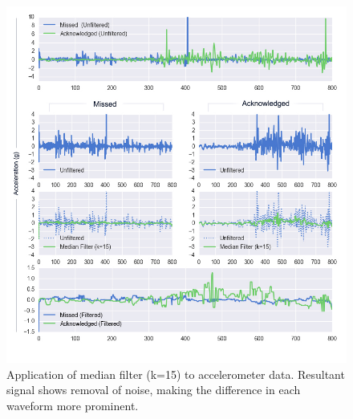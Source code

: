 \begin{figure}[h]
    \centering
        \includegraphics[scale=0.5, angle=0]{Files/treatment-study-1/figures/filtering_figure}
        \caption{Application of median filter (k=15) to accelerometer data. Resultant signal shows removal of noise, making the difference in each waveform more prominent.}
        \label{fig: apply-filter}
\end{figure}


